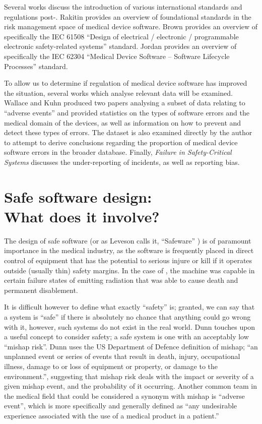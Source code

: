 \documentclass{cshonours}
\begin{document}
Several works discuss the introduction of various international standards and regulations post-\ther. Rakitin \cite{rakitin2006coping} provides an overview of foundational standards in the risk management space of medical device software. Brown \cite{brown2000overview} provides an overview of specifically the IEC 61508 ``Design of electrical / electronic / programmable electronic safety-related systems'' standard. Jordan \cite{jordan2006standard} provides an overview of specifically the IEC 62304 ``Medical Device Software -- Software Lifecycle Processes'' standard.

To allow us to determine if regulation of medical device software has improved the situation, several works which analyse relevant data will be examined. Wallace and Kuhn produced two papers \cite{wallace1999lessons,wallace2001failure} analysing a subset of \fda data relating to ``adverse events'' and provided statistics on the types of software errors and the medical domain of the devices, as well as information on how to prevent and detect these types of errors. The \fda \maude dataset \cite{maude} is also examined directly by the author to attempt to derive conclusions regarding the proportion of medical device software errors in the broader \maude database. Finally, \textit{Failure in Safety-Critical Systems} \cite[ch.~5]{johnson2003failure} discusses the under-reporting of incidents, as well as reporting bias.

\chapter{Safe software design:\\What does it involve?}
\label{chap:safesoftware}
The design of safe software (or as Leveson calls it, ``Safeware'' \cite{safeware}) is of paramount importance in the medical industry, as the software is frequently placed in direct control of equipment that has the potential to serious injure or kill if it operates outside (usually thin) safety margins. In the case of \ther, the machine was capable in certain failure states of emitting radiation that was able to cause death and permanent disablement.

It is difficult however to define what exactly ``safety'' is; granted, we can say that a system is ``safe'' if there is absolutely no chance that anything could go wrong with it, however, such systems do not exist in the real world. Dunn \cite{dunn2003designing} touches upon a useful concept to consider safety; a safe system is one with an acceptably low ``mishap risk''. Dunn uses the US Department of Defence definition of mishap; ``an unplanned event or series of events that result in death, injury, occupational illness, damage to or loss of equipment or property, or damage to the environment.'', suggesting that mishap risk deals with the impact or severity of a given mishap event, and the probability of it occurring. Another common team in the medical field that could be considered a synonym with mishap is ``adverse event'', which is more specifically and generally defined as ``any undesirable experience associated with the use of a medical product in a patient.'' \cite{fdaadverse}
\end{document}

